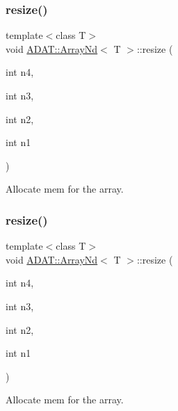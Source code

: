 \subsubsection{\texorpdfstring{resize()}{resize()}\hspace{0.1cm}{\footnotesize\ttfamily [9/10]}}
{\footnotesize\ttfamily template$<$class T$>$ \\
void \mbox{\hyperlink{classADAT_1_1ArrayNd}{A\+D\+A\+T\+::\+Array\+Nd}}$<$ T $>$\+::resize (\begin{DoxyParamCaption}\item[{int}]{n4,  }\item[{int}]{n3,  }\item[{int}]{n2,  }\item[{int}]{n1 }\end{DoxyParamCaption})\hspace{0.3cm}{\ttfamily [inline]}}



Allocate mem for the array. 

\mbox{\label{classADAT_1_1ArrayNd_a2a54d490a8a0a7aa9aeeaee6e6a84b90}} 
\subsubsection{\texorpdfstring{resize()}{resize()}\hspace{0.1cm}{\footnotesize\ttfamily [10/10]}}
{\footnotesize\ttfamily template$<$class T$>$ \\
void \mbox{\hyperlink{classADAT_1_1ArrayNd}{A\+D\+A\+T\+::\+Array\+Nd}}$<$ T $>$\+::resize (\begin{DoxyParamCaption}\item[{int}]{n4,  }\item[{int}]{n3,  }\item[{int}]{n2,  }\item[{int}]{n1 }\end{DoxyParamCaption})\hspace{0.3cm}{\ttfamily [inline]}}



Allocate mem for the array. 

\mbox{\label{classADAT_1_1ArrayNd_aa289b2d57b41dc1c61d061865e6cb912}} 
